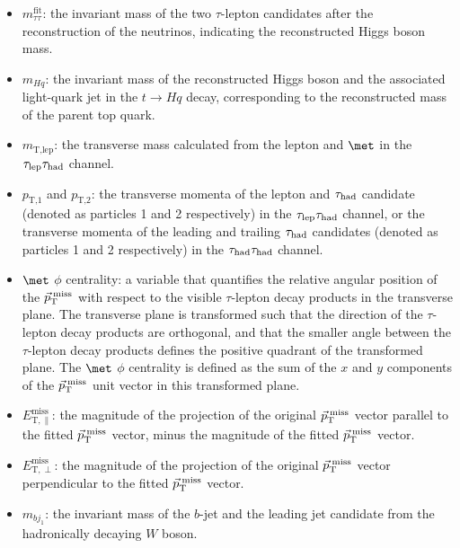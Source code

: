 \begin{itemize}
\item $m_{\tau\tau}^{\text{fit}}$: the invariant mass of the two $\tau$-lepton candidates after the reconstruction of the neutrinos, indicating the reconstructed Higgs boson mass.
\item $m_{Hq}$: the invariant mass of the reconstructed Higgs boson and the associated light-quark jet in the $t \to Hq$ decay, corresponding to the reconstructed mass of the parent top quark.
\item $m_{\text{T,lep}}$: the transverse mass calculated from the lepton and $\met$ in the $\tau_{\mathrm{lep}} \tau_{\mathrm{had}}$ channel.
\item $p_{\text{T,1}}$ and $p_{\text{T,2}}$:  the transverse momenta of the lepton and $\tau_{\mathrm{had}}$ candidate (denoted as particles 1 and 2 respectively) in the $\tau_{\mathrm{lep}} \tau_{\mathrm{had}}$ channel, or the transverse momenta of the leading and trailing $\tau_{\mathrm{had}}$ candidates (denoted as particles 1 and 2 respectively) in the $\tau_{\mathrm{had}} \tau_{\mathrm{had}}$ channel.
\item $\met$ $\phi$ centrality: a variable that quantifies the relative angular position of the $\vec{p}_\textrm{T}^\textrm{\;miss}$ with respect to the 
visible $\tau$-lepton decay products in the transverse plane. The transverse plane is transformed such that the direction of the $\tau$-lepton decay products are 
orthogonal, and that the smaller angle between the $\tau$-lepton decay products defines the positive quadrant of the transformed plane. 
The $\met$ $\phi$ centrality is defined as the sum of the $x$ and $y$ components of the $\vec{p}_\textrm{T}^\textrm{\;miss}$ unit vector in this transformed plane.
\item $E_{\text{T},\parallel}^{\text{miss}}$: the magnitude of the projection of the original $\vec{p}_\textrm{T}^\textrm{\;miss}$ vector parallel to the fitted $\vec{p}_\textrm{T}^\textrm{\;miss}$ vector, minus 
the magnitude of the fitted $\vec{p}_\textrm{T}^\textrm{\;miss}$ vector.
\item $E_{\text{T},\perp}^{\text{miss}}$: the magnitude of the projection of the original $\vec{p}_\textrm{T}^\textrm{\;miss}$ vector perpendicular to the fitted $\vec{p}_\textrm{T}^\textrm{\;miss}$ vector.
\item $m_{b j_1}$: the invariant mass of the $b$-jet and the leading jet candidate from the hadronically decaying $W$ boson.

\end{itemize}
